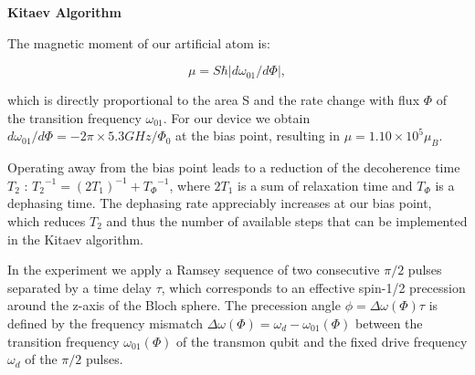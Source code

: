 \documentclass[a4paper, fontsize = 14pt]{article}
\begin{document}
\begin{center} \textbf{Kitaev Algorithm}
\end{center} 

The magnetic moment of our artificial atom is:

\begin{equation*}
	\mu = S \hbar |d \omega_{01}/d\Phi|,
\end{equation*}

which is directly proportional to the area S and the rate change with flux $\Phi$ of the transition frequency $\omega_{01}$. For our device we obtain $d\omega_{01}/d\Phi = -2\pi \times 5.3 GHz/\Phi_0$ at the bias point, resulting in $\mu = 1.10 \times 10^5 \mu_B$. 

Operating away from the bias point leads to a reduction of the decoherence time $T_2$ : ${T_2}^{-1} = (2T_1)^{-1} + {T_\Phi}^{-1}$, where $2T_1$ is a sum of relaxation time and $T_\Phi$ is a dephasing time. The dephasing rate appreciably increases at our bias point, which reduces $T_2$ and thus the number of available steps that can be implemented in the Kitaev algorithm. 

In the experiment we apply a Ramsey sequence of two consecutive $\pi/2$ pulses separated by a time delay $\tau$, which corresponds to an effective spin-1/2 precession around the z-axis of the Bloch sphere. The precession angle $\phi = \Delta \omega (\Phi) \tau$ is defined by the frequency mismatch $\Delta \omega(\Phi) = \omega_d - \omega_{01}(\Phi)$ between the transition frequency $\omega_{01}(\Phi)$ of the transmon qubit and the fixed drive frequency $\omega_d$ of the $\pi/2$ pulses. 
\end{document}
